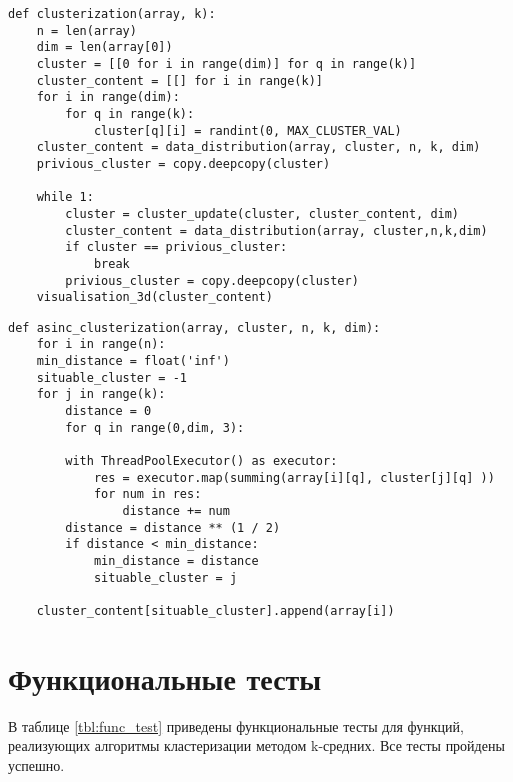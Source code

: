 \begin{center}
\captionsetup{justification=raggedright,singlelinecheck=off}
\begin{lstlisting}[label=lst:standard,caption=Алгоритм кластеризации методом k-средних]
def clusterization(array, k):
	n = len(array)
	dim = len(array[0])
	cluster = [[0 for i in range(dim)] for q in range(k)]
	cluster_content = [[] for i in range(k)]
	for i in range(dim):
		for q in range(k):
			cluster[q][i] = randint(0, MAX_CLUSTER_VAL)
	cluster_content = data_distribution(array, cluster, n, k, dim)
	privious_cluster = copy.deepcopy(cluster)

	while 1:
		cluster = cluster_update(cluster, cluster_content, dim)
		cluster_content = data_distribution(array, cluster,n,k,dim)
		if cluster == privious_cluster:
			break
		privious_cluster = copy.deepcopy(cluster)
	visualisation_3d(cluster_content)
\end{lstlisting} 
\end{center}
\clearpage

\begin{center}
\captionsetup{justification=raggedright,singlelinecheck=off}
\begin{lstlisting}[label=lst:optimized,caption=Параллельная реализация алгоритма кластеризации]
def asinc_clusterization(array, cluster, n, k, dim):
    for i in range(n):
	min_distance = float('inf')
	situable_cluster = -1
	for j in range(k):
		distance = 0
		for q in range(0,dim, 3):

		with ThreadPoolExecutor() as executor:
			res = executor.map(summing(array[i][q], cluster[j][q] ))
			for num in res:
				distance += num
		distance = distance ** (1 / 2)
		if distance < min_distance:
			min_distance = distance
			situable_cluster = j

	cluster_content[situable_cluster].append(array[i])
\end{lstlisting}
\end{center}

\section{Функциональные тесты}

В таблице \ref{tbl:func_test} приведены функциональные тесты для функций, реализующих алгоритмы кластеризации методом k-средних. Все тесты пройдены успешно. \newpage

